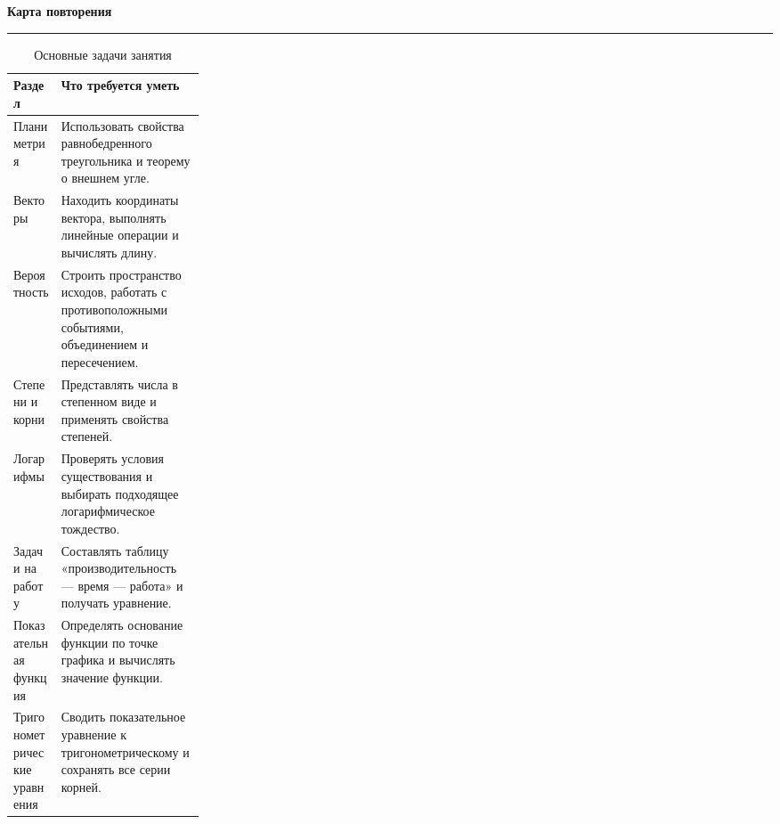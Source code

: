 \documentclass[a4paper,12pt]{article}
\newcommand{\topic}[1]{%
  \par\bigskip
  {\Large\bfseries\color{darkaccent}#1\par}
  \vspace{0.2em}
  {\color{accent}\rule{\linewidth}{0.7pt}}
  \vspace{0.55em}
}
\begin{document}
\begin{titlepage}
\end{titlepage}

\topic{Карта повторения}

\begin{table}[htbp]
  \caption{Основные задачи занятия}
  \centering
  \begin{tabularx}{\linewidth}{@{}p{0.25\linewidth}X@{}}
    \toprule
    \textbf{Раздел} & \textbf{Что требуется уметь} \\
    \midrule
    Планиметрия &
    Использовать свойства равнобедренного треугольника и теорему о внешнем угле. \\

    Векторы &
    Находить координаты вектора, выполнять линейные операции и вычислять длину. \\

    Вероятность &
    Строить пространство исходов, работать с противоположными событиями, объединением и пересечением. \\

    Степени и корни &
    Представлять числа в степенном виде и применять свойства степеней. \\

    Логарифмы &
    Проверять условия существования и выбирать подходящее логарифмическое тождество. \\

    Задачи на работу &
    Составлять таблицу «производительность --- время --- работа» и получать уравнение. \\

    Показательная функция &
    Определять основание функции по точке графика и вычислять значение функции. \\

    Тригонометрические уравнения &
    Сводить показательное уравнение к тригонометрическому и сохранять все серии корней. \\
    \bottomrule
  \end{tabularx}
\end{table}
\end{document}
